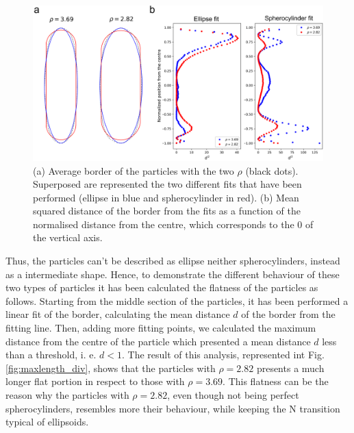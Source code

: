 \documentclass{article}
\begin{document}
\begin{figure}
    \centering
    \includegraphics[width=1\columnwidth]{Mean_bord.png}
    \caption{(a) Average border of the particles with the two $\rho$ (black dots). Superposed are represented the two different fits that have been performed (ellipse in blue and spherocylinder in red). (b) Mean squared distance of the border from the fits as a function of the normalised distance from the centre, which corresponds to the $0$ of the vertical axis.}
    \label{fig:Mean_bord}
\end{figure}

Thus, the particles can't be described as ellipse neither spherocylinders, instead as a intermediate shape. Hence, to demonstrate the different behaviour of these two types of particles it has been calculated the flatness of the particles as follows. Starting from the middle section of the particles, it has been performed a linear fit of the border, calculating the mean distance $d$ of the border from the fitting line. Then, adding more fitting points, we calculated the maximum distance from the centre of the particle which presented a mean distance $d$ less than a threshold, i. e. $d < 1$. The result of this analysis, represented int Fig. \ref{fig:maxlength_div}, shows that the particles with $\rho=2.82$ presents a much longer flat portion in respect to those with $\rho=3.69$. This flatness can be the reason why the particles with $\rho=2.82$, even though not being perfect spherocylinders, resembles more their behaviour, while keeping the N transition typical of ellipsoids. 
\end{document}
